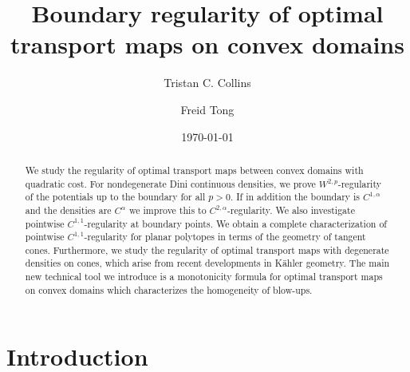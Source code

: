 \documentclass[12pt,reqno]{amsart}
\title{Boundary regularity of optimal transport maps on convex domains}
\author{Tristan C. Collins}
\author{Freid Tong}
\date{\today}
\numberwithin{equation}{section}
\begin{document}
\maketitle
\begin{abstract}
We study the regularity of optimal transport maps between convex domains with quadratic cost. For nondegenerate Dini continuous densities, we prove  $W^{2,p}$-regularity of the potentials up to the boundary for all $p>0$. If in addition the boundary is $C^{1, \alpha}$ and the densities are $C^{\alpha}$ we improve this to $C^{2, \alpha}$-regularity. We also investigate pointwise $C^{1, 1}$-regularity at boundary points. We obtain a complete characterization of pointwise $C^{1, 1}$-regularity for planar polytopes in terms of the geometry of tangent cones. Furthermore, we study the regularity of optimal transport maps with degenerate densities on cones, which arise from recent developments in K\"ahler geometry. The main new technical tool we introduce is a monotonicity formula for optimal transport maps on convex domains which characterizes the homogeneity of blow-ups. 
\end{abstract}
\tableofcontents

\section{Introduction}
\end{document}
